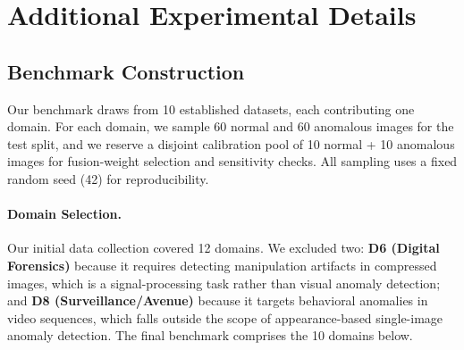 \section{Additional Experimental Details}
\label{app:details}

\subsection{Benchmark Construction}
\label{app:benchmark}

Our benchmark draws from 10 established datasets, each contributing one domain. For each domain, we sample 60 normal and 60 anomalous images for the test split, and we reserve a disjoint calibration pool of 10 normal + 10 anomalous images for fusion-weight selection and sensitivity checks. All sampling uses a fixed random seed (42) for reproducibility.

\paragraph{Domain Selection.}
Our initial data collection covered 12 domains. We excluded two: \textbf{D6 (Digital Forensics)} because it requires detecting manipulation artifacts in compressed images, which is a signal-processing task rather than visual anomaly detection; and \textbf{D8 (Surveillance/Avenue)} because it targets behavioral anomalies in video sequences, which falls outside the scope of appearance-based single-image anomaly detection. The final benchmark comprises the 10 domains below.

